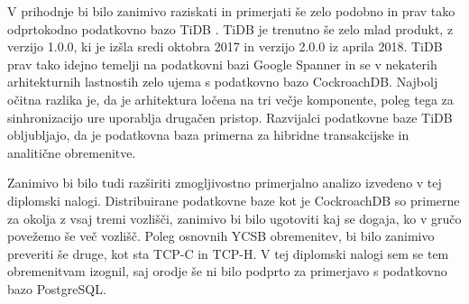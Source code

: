 \documentclass[a4paper, 12pt]{book}
\begin{document}
V prihodnje bi bilo zanimivo raziskati in primerjati še zelo podobno in prav tako odprtokodno podatkovno bazo TiDB \cite{PingCAP-home}. TiDB je trenutno še zelo mlad produkt, z verzijo 1.0.0, ki je izšla sredi oktobra 2017 in verzijo 2.0.0 iz aprila 2018. TiDB prav tako idejno temelji na podatkovni bazi Google Spanner in se v nekaterih arhitekturnih lastnostih zelo ujema s podatkovno bazo CockroachDB. Najbolj očitna razlika je, da je arhitektura ločena na tri večje komponente, poleg tega za sinhronizacijo ure uporablja drugačen pristop. Razvijalci podatkovne baze TiDB obljubljajo, da je podatkovna baza primerna za hibridne transakcijske in analitične obremenitve.

Zanimivo bi bilo tudi razširiti zmogljivostno primerjalno analizo izvedeno v tej diplomski nalogi. Distribuirane podatkovne baze kot je CockroachDB so primerne za okolja z vsaj tremi vozlišči, zanimivo bi bilo ugotoviti kaj se dogaja, ko v gručo povežemo še več vozlišč. Poleg osnovnih YCSB obremenitev, bi bilo zanimivo preveriti še druge, kot sta TCP-C in TCP-H. V tej diplomski nalogi sem se tem obremenitvam izognil, saj orodje \cite{cockroachdb/loadgen} še ni bilo podprto za primerjavo s podatkovno bazo PostgreSQL.


\newpage %
\ \\
\clearpage
{}


\end{document}
